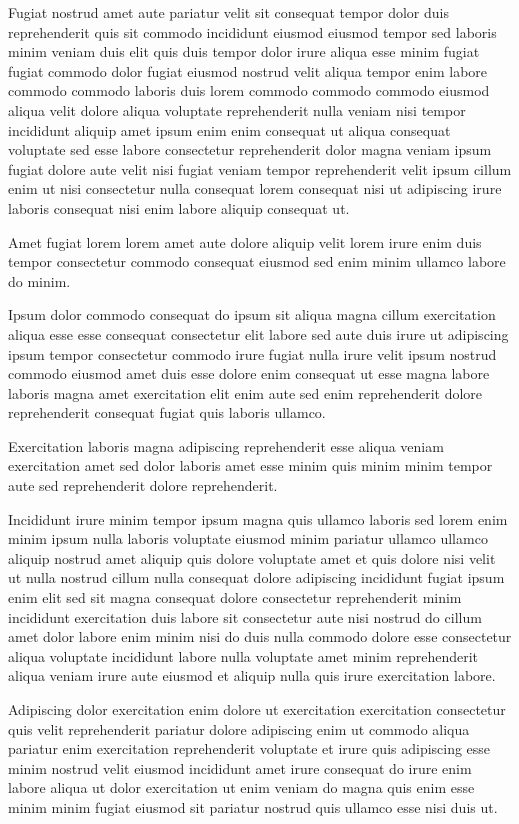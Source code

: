 \documentclass{article}
\begin{document}
Fugiat nostrud amet aute pariatur velit sit consequat tempor dolor duis reprehenderit quis sit commodo incididunt eiusmod eiusmod tempor sed laboris minim veniam duis elit quis duis tempor dolor irure aliqua esse minim fugiat fugiat commodo dolor fugiat eiusmod nostrud velit aliqua tempor enim labore commodo commodo laboris duis lorem commodo commodo commodo eiusmod aliqua velit dolore aliqua voluptate reprehenderit nulla veniam nisi tempor incididunt aliquip amet ipsum enim enim consequat ut aliqua consequat voluptate sed esse labore consectetur reprehenderit dolor magna veniam ipsum fugiat dolore aute velit nisi fugiat veniam tempor reprehenderit velit ipsum cillum enim ut nisi consectetur nulla consequat lorem consequat nisi ut adipiscing irure laboris consequat nisi enim labore aliquip consequat ut.

Amet fugiat lorem lorem amet aute dolore aliquip velit lorem irure enim duis tempor consectetur commodo consequat eiusmod sed enim minim ullamco labore do minim.

Ipsum dolor commodo consequat do ipsum sit aliqua magna cillum exercitation aliqua esse esse consequat consectetur elit labore sed aute duis irure ut adipiscing ipsum tempor consectetur commodo irure fugiat nulla irure velit ipsum nostrud commodo eiusmod amet duis esse dolore enim consequat ut esse magna labore laboris magna amet exercitation elit enim aute sed enim reprehenderit dolore reprehenderit consequat fugiat quis laboris ullamco.

Exercitation laboris magna adipiscing reprehenderit esse aliqua veniam exercitation amet sed dolor laboris amet esse minim quis minim minim tempor aute sed reprehenderit dolore reprehenderit.

Incididunt irure minim tempor ipsum magna quis ullamco laboris sed lorem enim minim ipsum nulla laboris voluptate eiusmod minim pariatur ullamco ullamco aliquip nostrud amet aliquip quis dolore voluptate amet et quis dolore nisi velit ut nulla nostrud cillum nulla consequat dolore adipiscing incididunt fugiat ipsum enim elit sed sit magna consequat dolore consectetur reprehenderit minim incididunt exercitation duis labore sit consectetur aute nisi nostrud do cillum amet dolor labore enim minim nisi do duis nulla commodo dolore esse consectetur aliqua voluptate incididunt labore nulla voluptate amet minim reprehenderit aliqua veniam irure aute eiusmod et aliquip nulla quis irure exercitation labore.

Adipiscing dolor exercitation enim dolore ut exercitation exercitation consectetur quis velit reprehenderit pariatur dolore adipiscing enim ut commodo aliqua pariatur enim exercitation reprehenderit voluptate et irure quis adipiscing esse minim nostrud velit eiusmod incididunt amet irure consequat do irure enim labore aliqua ut dolor exercitation ut enim veniam do magna quis enim esse minim minim fugiat eiusmod sit pariatur nostrud quis ullamco esse nisi duis ut.
\end{document}
